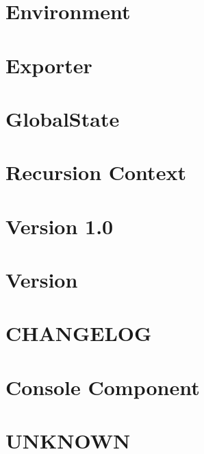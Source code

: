\documentclass[twoside]{book}
\newcommand{\+}{\discretionary{\mbox{\scriptsize$\hookleftarrow$}}{}{}}
\begin{document}
\chapter{Environment}
\label{md_vendor_sebastian_environment__r_e_a_d_m_e}

\chapter{Exporter}
\label{md_vendor_sebastian_exporter__r_e_a_d_m_e}

\chapter{Global\+State}
\label{md_vendor_sebastian_global-state__r_e_a_d_m_e}

\chapter{Recursion Context}
\label{md_vendor_sebastian_recursion-context__r_e_a_d_m_e}

\chapter{Version 1.0}
\label{md_vendor_sebastian_version__change_log}

\chapter{Version}
\label{md_vendor_sebastian_version__r_e_a_d_m_e}

\chapter{C\+H\+A\+N\+G\+E\+L\+O\+G}
\label{md_vendor_symfony_console__symfony__component__console__c_h_a_n_g_e_l_o_g}

\chapter{Console Component}
\label{md_vendor_symfony_console__symfony__component__console__r_e_a_d_m_e}

\chapter{U\+N\+K\+N\+O\+W\+N}
\label{md_vendor_symfony_console__symfony__component__console__tests__fixtures_application_1}

\end{document}
